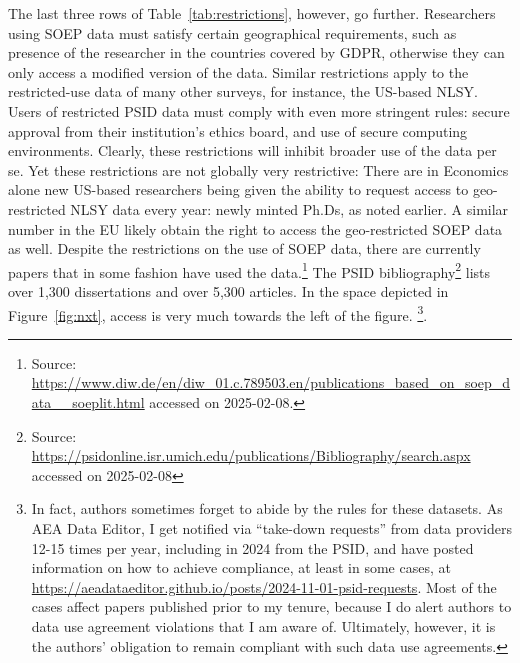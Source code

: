 \documentclass{article}
\begin{document}
The last three rows of  Table~\ref{tab:restrictions}, however, go further. Researchers using SOEP data must satisfy certain geographical requirements, such as presence of the researcher in the countries covered by \ac{GDPR}, otherwise they can only access a modified version of the data. Similar restrictions apply to the restricted-use data of many other surveys, for instance, the US-based \ac{NLSY}. Users of restricted PSID data must comply with even more stringent rules: secure approval from their institution's ethics board, and use of secure computing environments. Clearly, these restrictions will inhibit broader use of the data per se. Yet these restrictions are not globally very restrictive: There are in Economics alone \economicsgrads{} new US-based researchers being given the ability to request access to geo-restricted NLSY data every year: newly minted Ph.Ds, as noted earlier. A similar number in the EU likely obtain the right to access the geo-restricted SOEP data as well. Despite the restrictions on the use of SOEP data, there are currently \soeppapers{} papers that in some fashion have used the data.\footnote{Source: \url{https://www.diw.de/en/diw_01.c.789503.en/publications_based_on_soep_data__soeplit.html} accessed on 2025-02-08.} 
The PSID bibliography\footnote{Source: \url{https://psidonline.isr.umich.edu/publications/Bibliography/search.aspx} accessed on 2025-02-08} lists over 1,300 dissertations and over 5,300 articles.
In the space depicted in Figure~\ref{fig:nxt}, access is very much towards the left of the figure.%
%
\footnote{In fact, authors sometimes forget to abide by the rules for these datasets. As AEA Data Editor, I get notified via ``take-down requests'' from data providers 12-15 times per year, including in 2024 from the PSID, and have posted information on how to achieve compliance, at least in some cases, at \url{https://aeadataeditor.github.io/posts/2024-11-01-psid-requests}. Most of the cases affect papers published prior to my tenure, because I do alert authors to  data use agreement violations that I am aware of. Ultimately, however, it is the authors' obligation to remain compliant with such data use agreements.}. 
\end{document}
